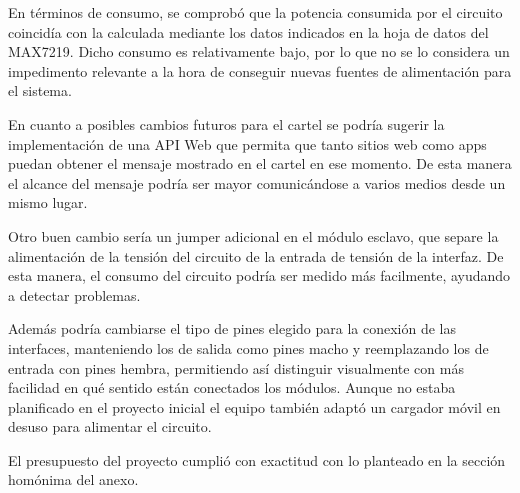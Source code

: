 En términos de consumo, se comprobó que la potencia consumida por el circuito coincidía con la calculada mediante los datos indicados en la hoja de datos del MAX7219. Dicho consumo es relativamente bajo, por lo que no se lo considera un impedimento relevante a la hora de conseguir nuevas fuentes de alimentación para el sistema. 

En cuanto a posibles cambios futuros para el cartel se podría sugerir la implementación de una API Web que permita que tanto sitios web como apps puedan obtener el mensaje mostrado en el cartel en ese momento. De esta manera el alcance del mensaje podría ser mayor comunicándose a varios medios desde un mismo lugar.

Otro buen cambio sería un jumper adicional en el módulo esclavo, que separe la alimentación de la tensión del circuito de la entrada de tensión de la interfaz. De esta manera, el consumo del circuito podría ser medido más facilmente, ayudando a detectar problemas.

Además podría cambiarse el tipo de pines elegido para la conexión de las interfaces, manteniendo los de salida como pines macho y reemplazando los de entrada con pines hembra, permitiendo así distinguir visualmente con más facilidad en qué sentido están conectados los módulos.
Aunque no estaba planificado en el proyecto inicial el equipo también adaptó un cargador móvil en desuso para alimentar el circuito.

El presupuesto del proyecto cumplió con exactitud con lo planteado en la sección homónima del anexo.
